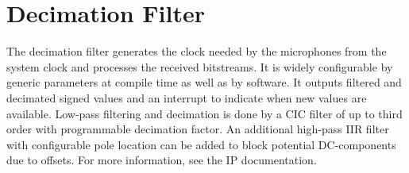 
\section{Decimation Filter}
\label{sec::filter}

The decimation filter generates the clock needed by the microphones from the system clock and processes the received bitstreams.
It is widely configurable by generic parameters at compile time as well as by software. 
It outputs filtered and decimated signed values and an interrupt to indicate when new values are available.
Low-pass filtering and decimation is done by a CIC filter of up to third order with programmable decimation factor.
An additional high-pass IIR filter with configurable pole location can be added to block potential DC-components due to offsets.
For more information, see the IP documentation.